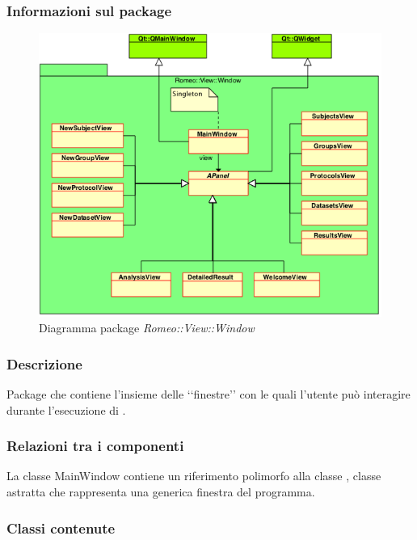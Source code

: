 		\subsubsection{Informazioni sul package}
		\label{info_window}
		\begin{figure}[!h]
					\centering
					\includegraphics[width=\linewidth]{./Content/Immagini/Window.png}
					\caption{Diagramma package \textsl{Romeo::View::Window}}
					\label{comp_romeo::view::window}
				\end{figure}
		\subsubsection{Descrizione}
		\label{descr_window}
		Package\glossario{} che contiene l'insieme delle \lq\lq{}finestre\rq\rq{} con le quali l'utente può interagire durante l'esecuzione di \project{}.
		
		\subsubsection{Relazioni tra i componenti}
		La classe MainWindow contiene un riferimento polimorfo alla classe , classe astratta che rappresenta una generica finestra del programma.
		
		\subsubsection{Classi contenute}
